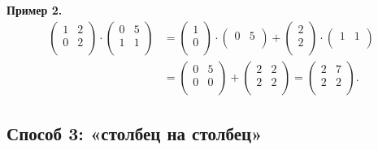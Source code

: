 \documentclass[11pt,a4paper]{article}
\begin{document}
    \textbf{Пример 2.} \[
\begin{aligned}
  \begin{pmatrix}
     1 & 2 \\
     0 & 2 \\
  \end{pmatrix}
  \cdot
  \begin{pmatrix}
     0 & 5 \\
     1 & 1 \\
  \end{pmatrix}
  &=
  \begin{pmatrix}
     1 \\
     0 \\
  \end{pmatrix}
  \cdot
  \begin{pmatrix}
     0 & 5 \\
  \end{pmatrix}
  +
  \begin{pmatrix}
     2 \\
     2 \\
  \end{pmatrix}
  \cdot
  \begin{pmatrix}
     1 & 1 \\
  \end{pmatrix}
  \\
  &=
  \begin{pmatrix}
     0 & 5 \\
     0 & 0 \\
  \end{pmatrix}
  +
  \begin{pmatrix}
     2 & 2 \\
     2 & 2 \\
  \end{pmatrix}
  =
  \begin{pmatrix}
     2 & 7 \\
     2 & 2 \\
  \end{pmatrix}
  .
\end{aligned}
\]

    \hypertarget{ux441ux43fux43eux441ux43eux431-3-ux441ux442ux43eux43bux431ux435ux446-ux43dux430-ux441ux442ux43eux43bux431ux435ux446}{%
\subsection{Способ 3: «столбец на
столбец»}\label{ux441ux43fux43eux441ux43eux431-3-ux441ux442ux43eux43bux431ux435ux446-ux43dux430-ux441ux442ux43eux43bux431ux435ux446}}
\end{document}
